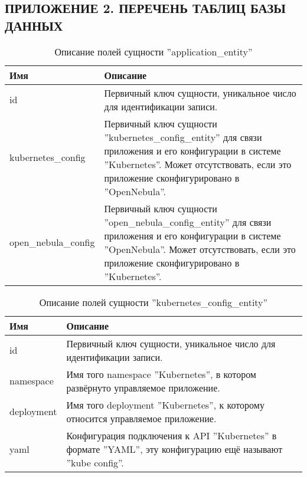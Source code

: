 \begin{center}
\section*{ПРИЛОЖЕНИЕ 2. ПЕРЕЧЕНЬ ТАБЛИЦ БАЗЫ ДАННЫХ}
\end{center}

\begin{table}[hbtp]
    \caption{Описание полей сущности ''application\_entity''}
    \begin{tabularx}{\linewidth}{l X}
        \textbf{Имя} & \textbf{Описание} \\
        \hline
        id & Первичный ключ сущности, уникальное число для идентификации записи. \\
        \hline
        kubernetes\_config & Первичный ключ сущности ''kubernetes\_config\_entity'' для связи приложения и его конфигурации в системе ''Kubernetes''. Может отсутствовать, если это приложение сконфигурировано в ''OpenNebula''. \\
        \hline
        open\_nebula\_config & Первичный ключ сущности ''open\_nebula\_config\_entity'' для связи приложения и его конфигурации в системе ''OpenNebula''. Может отсутствовать, если это приложение сконфигурировано в ''Kubernetes''. \\
    \end{tabularx}
    \label{db-scheme-app}
\end{table}

\begin{table}[hbtp]
    \caption{Описание полей сущности ''kubernetes\_config\_entity''}
    \begin{tabularx}{\linewidth}{l X}
        \textbf{Имя} & \textbf{Описание} \\
        \hline
        id & Первичный ключ сущности, уникальное число для идентификации записи. \\
        \hline
        namespace & Имя того namespace ''Kubernetes'', в котором развёрнуто управляемое приложение. \\
        \hline
        deployment & Имя того deployment ''Kubernetes'', к которому относится управляемое приложение. \\
        \hline
        yaml & Конфигурация подключения к API ''Kubernetes'' в формате ''YAML'', эту конфигурацию ещё называют ''kube config''. \\
    \end{tabularx}
    \label{db-scheme-kub}
\end{table}

